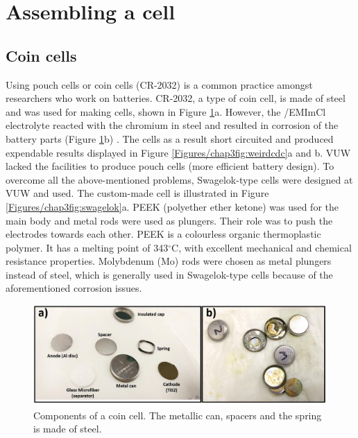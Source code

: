 \section{Assembling a cell}

\subsection*{Coin cells}
Using pouch cells or coin cells (CR-2032\textregistered) is a common practice amongst researchers who work on batteries. CR-2032, a type of coin cell, is made of steel and was used for making cells, shown in Figure \ref{Figures/chap3fig:concell}a. However, the /EMImCl electrolyte reacted with the chromium in steel and resulted in corrosion of the battery parts (Figure \ref{Figures/chap3fig:concell}b) \cite{das_aluminium-ion_2017}. The cells as a result short circuited and produced expendable results displayed in Figure \ref{Figures/chap3fig:weirdcdc}a and b. VUW lacked the facilities to produce pouch cells (more efficient battery design). To overcome all the above-mentioned problems, Swagelok-type cells were designed at VUW and used. The custom-made cell is illustrated in Figure \ref{Figures/chap3fig:swagelok}a. PEEK (polyether ether ketone) was used for the main body and metal rods were used as plungers. Their role was to push the electrodes towards each other. PEEK is a colourless organic thermoplastic polymer. It has a melting point of 343$^{\circ}$C, with excellent mechanical and chemical resistance properties. Molybdenum (Mo) rods were chosen as metal plungers instead of steel, which is generally used in Swagelok-type cells because of the aforementioned corrosion issues. 

\begin{figure}[tbh!]
\centering
\includegraphics[width=\textwidth]{Figures/chap3fig/concell.pdf}
\caption{Components of a coin cell. The metallic can, spacers and the spring is made of steel.}
\label{Figures/chap3fig:concell}
\end{figure}

